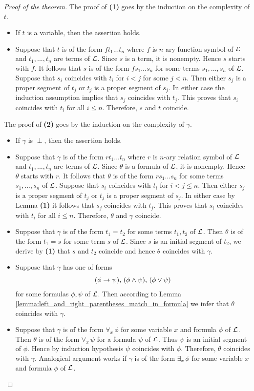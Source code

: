 \documentclass[10pt]{amsart}
\begin{document}
\begin{proof}[Proof of the theorem]
	The proof of \textbf{(1)} goes by the induction on the complexity of $t$.
	\begin{itemize}
		\item If $t$ is a variable, then the assertion holds.
		\item Suppose that $t$ is of the form $ft_1...t_n$ where $f$ is $n$-ary function symbol of ${\mathcal L}$ and $t_1,...,t_n$ are terms of ${\mathcal L}$. Since $s$ is a term, it is nonempty. Hence $s$ starts with $f$. It follows that $s$ is of the form $fs_1...s_n$ for some terms $s_1,...,s_n$ of ${\mathcal L}$. Suppose that $s_i$ coincides with $t_i$ for $i < j$ for some $j < n$. Then either $s_j$ is a proper segment of $t_j$ or $t_j$ is a proper segment of $s_j$. In either case the induction assumption implies that $s_j$ coincides with $t_j$. This proves that $s_i$ coincides with $t_i$ for all $i \leq n$. Therefore, $s$ and $t$ coincide.
	\end{itemize}

	The proof of \textbf{(2)} goes by the induction on the complexity of $\gamma$.
  \begin{itemize}
		\item If $\gamma$ is $\perp$, then the assertion holds.
		\item Suppose that $\gamma$ is of the form $rt_1...t_n$ where $r$ is $n$-ary relation symbol of ${\mathcal L}$ and $t_1,...,t_n$ are terms of ${\mathcal L}$. Since $\theta$ is a formula of ${\mathcal L}$, it is nonempty. Hence $\theta$ starts with $r$. It follows that $\theta$ is of the form $rs_1...s_n$ for some terms $s_1,...,s_n$ of ${\mathcal L}$. Suppose that $s_i$ coincides with $t_i$ for $i < j \leq n$. Then either $s_j$ is a proper segment of $t_j$ or $t_j$ is a proper segment of $s_j$. In either case by Lemma \textbf{(1)} it follows that $s_j$ coincides with $t_j$. This proves that $s_i$ coincides with $t_i$ for all $i \leq n$. Therefore, $\theta$ and $\gamma$ coincide.
		\item Suppose that $\gamma$ is of the form $t_1 = t_2$ for some terms $t_1,t_2$ of ${\mathcal L}$. Then $\theta$ is of the form $t_1 = s$ for some term $s$ of ${\mathcal L}$. Since $s$ is an initial segment of $t_2$, we derive by \textbf{(1)} that $s$ and $t_2$ coincide and hence $\theta$ coincides with $\gamma$.
		\item Suppose that $\gamma$ has one of forms
		      $$(\phi \rightarrow \psi),\,(\phi \wedge \psi),\,(\phi \vee \psi)$$
		      for some formulas $\phi,\psi$ of ${\mathcal L}$. Then according to Lemma \ref{lemma:left_and_right_parentheses_match_in_formula} we infer that $\theta$ coincides with $\gamma$.
		\item Suppose that $\gamma$ is of the form $\forall_x\,\phi$ for some variable $x$ and formula $\phi$ of ${\mathcal L}$. Then $\theta$ is of the form $\forall_x\,\psi$ for a formula $\psi$ of ${\mathcal L}$. Thus $\psi$ is an initial segment of $\phi$. Hence by induction hypothesis $\psi$ coincides with $\phi$. Therefore, $\theta$ coincides with $\gamma$. Analogical argument works if $\gamma$ is of the form $\exists_x\,\phi$ for some variable $x$ and formula $\phi$ of ${\mathcal L}$.
	\end{itemize}
\end{proof}
\end{document}
